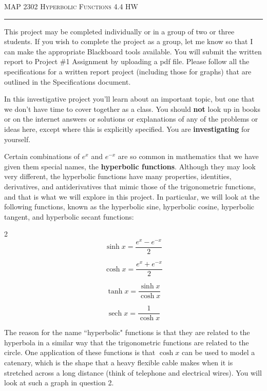 \documentclass[12pt]{amsart}
\DeclareMathOperator{\sech}{sech}
\begin{document}
\thispagestyle{empty}

{\scshape MAP 2302} \hfill {\scshape \large Hyperbolic Functions} \hfill {4.4 HW\scshape }
 
\smallskip

\hrule

\bigskip

This project may be completed individually or in a group of two or three students.  If you wish to complete the project as a group, let me know so that I can make the appropriate Blackboard tools available.  You will submit the written report to Project \#1 Assignment by uploading a pdf file.  Please follow all the specifications for a written report project (including those for graphs) that are outlined in the Specifications document.

\bigskip

In this investigative project you'll learn about an important topic, but one that we don't have time to cover together as a class.  You should {\bf not} look up in books or on the internet answers or solutions or explanations of any of the problems or ideas here, except where this is explicitly specified.  You are {\bf investigating} for yourself.  

\medskip

Certain combinations of $e^x$ and $e^{-x}$ are so common in mathematics that we have given them special
names, the {\bf hyperbolic functions}. Although they may look very different, the hyperbolic functions
have many properties, identities, derivatives, and antiderivatives that mimic those of the trigonometric functions,
and that is what we will explore in this project. In particular, we will look at the following
functions, known as the hyperbolic sine, hyperbolic cosine, hyperbolic tangent, and hyperbolic
secant functions:
\begin{multicols}{2}
$$\sinh x = \frac{e^x - e^{-x}}{2}$$

$$\cosh x = \frac{e^x + e^{-x}}{2}$$

$$\tanh x = \frac{\sinh x}{\cosh x}$$

$$\sech x = \frac{1}{\cosh x}$$

\end{multicols}

The reason for the name ``hyperbolic" functions is that they are related to the hyperbola in a similar
way that the trigonometric functions are related to the circle. One application of these functions is
that $\cosh x$ can be used to model a catenary, which is the shape that a heavy flexible cable makes
when it is stretched across a long distance (think of telephone and electrical wires). You will look
at such a graph in question 2.
\end{document}
